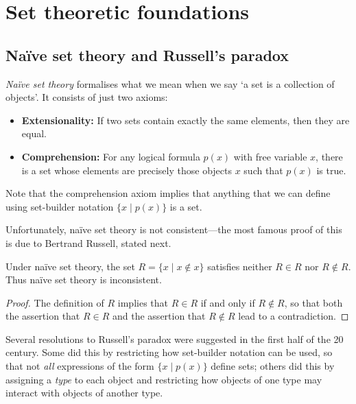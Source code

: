 \section{Set theoretic foundations}

\subsection*{Na\"{i}ve set theory and Russell's paradox}

\textit{Na\"{i}ve set theory} formalises what we mean when we say `a set is a collection of objects'. It consists of just two axioms:
\begin{itemize}
\item \textbf{Extensionality:} If two sets contain exactly the same elements, then they are equal.
\item \textbf{Comprehension:} For any logical formula $p(x)$ with free variable $x$, there is a set whose elements are precisely those objects $x$ such that $p(x)$ is true.
\end{itemize}

Note that the comprehension axiom implies that anything that we can define using set-builder notation $\{ x \mid p(x) \}$ is a set.

Unfortunately, na\"{i}ve set theory is not consistent---the most famous proof of this is due to Bertrand Russell, stated next.

\begin{theorem}
\label{thmRussellsParadox}
Under na\"{i}ve set theory, the set $R = \{ x \mid x \not\in x \}$ satisfies neither $R \in R$ nor $R \not\in R$. Thus na\"{i}ve set theory is inconsistent.
\end{theorem}

\begin{proof}
The definition of $R$ implies that $R \in R$ if and only if $R \not\in R$, so that both the assertion that $R \in R$ and the assertion that $R \not\in R$ lead to a contradiction.
\end{proof}

Several resolutions to Russell's paradox were suggested in the first half of the 20\supth{} century. Some did this by restricting how set-builder notation can be used, so that not \textit{all} expressions of the form $\{ x \mid p(x) \}$ define sets; others did this by assigning a \textit{type} to each object and restricting how objects of one type may interact with objects of another type.

